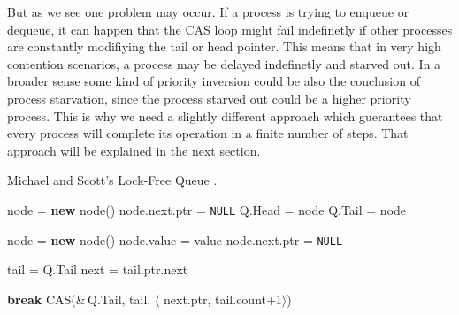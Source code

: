 But as we see one problem may occur. If a process is trying to enqueue or dequeue, it can happen that the \ac{CAS} loop might fail indefinetly if other processes are constantly modifiying the tail or head pointer. This means that in very high contention scenarios, a process may be delayed indefinetly and starved out. In a broader sense some kind of priority inversion could be also the conclusion of process starvation, since the process starved out could be a higher priority process. This is why we need a slightly different approach which guerantees that every process will complete its operation in a finite number of steps. That approach will be explained in the next section. \cite{MichaelScottQueue}

\begin{algorithm}[!ht]
    \centering
    \captionsetup{justification=centering}
    \caption{Michael and Scott's Lock-Free Queue \cite{MichaelScottQueue}.}
    \label{alg:michael-scott}
    \scriptsize
    \begin{algorithmic}[1]

        \State node = \textbf{new} node() 
        \State node.next.ptr = \texttt{NULL}
        \State Q.Head = node 
        \State Q.Tail = node 
    \EndFunction
    
        \State node = \textbf{new} node() 
        \State node.value = value
        \State node.next.ptr = \texttt{NULL}
    
        \Loop 
            \State tail = Q.Tail
            \State next = tail.ptr.next
    
                        \State \textbf{break}
                    \EndIf
                \Else 
                    \State CAS($\&$\,Q.Tail,\; tail,\; $\langle$ next.ptr,\; tail.count+1$\rangle$)
                \EndIf
            \EndIf
        \EndLoop
    

\end{algorithmic}
\end{algorithm}
